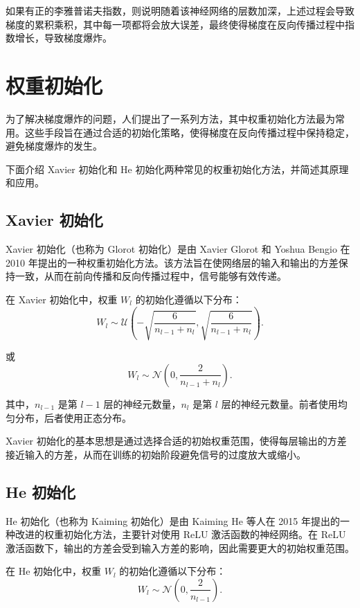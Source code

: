 如果有正的李雅普诺夫指数，则说明随着该神经网络的层数加深，上述过程会导致梯度的累积乘积，其中每一项都将会放大误差，最终使得梯度在反向传播过程中指数增长，导致梯度爆炸。

\section{权重初始化}

为了解决梯度爆炸的问题，人们提出了一系列方法，其中权重初始化方法最为常用。这些手段旨在通过合适的初始化策略，使得梯度在反向传播过程中保持稳定，避免梯度爆炸的发生。

下面介绍 Xavier 初始化和 He 初始化两种常见的权重初始化方法，并简述其原理和应用。

\subsection{Xavier 初始化}

Xavier 初始化（也称为 Glorot 初始化）是由 Xavier Glorot 和 Yoshua Bengio 在 2010 年提出的一种权重初始化方法。该方法旨在使网络层的输入和输出的方差保持一致，从而在前向传播和反向传播过程中，信号能够有效传递。

在 Xavier 初始化中，权重 \( W_l \) 的初始化遵循以下分布：
\begin{equation}
  W_l \sim \mathcal{U}\left(-\sqrt{\frac{6}{n_{l-1} + n_l}}, \sqrt{\frac{6}{n_{l-1} + n_l}}\right).
\end{equation}

或
\begin{equation}
  W_l \sim \mathcal{N}\left(0, \frac{2}{n_{l-1} + n_l}\right).
\end{equation}

其中，\( n_{l-1} \) 是第 \( l-1 \) 层的神经元数量，\( n_l \) 是第 \( l \) 层的神经元数量。前者使用均匀分布，后者使用正态分布。

Xavier 初始化的基本思想是通过选择合适的初始权重范围，使得每层输出的方差接近输入的方差，从而在训练的初始阶段避免信号的过度放大或缩小。

\subsection{He 初始化}

He 初始化（也称为 Kaiming 初始化）是由 Kaiming He 等人在 2015 年提出的一种改进的权重初始化方法，主要针对使用 ReLU 激活函数的神经网络。在 ReLU 激活函数下，输出的方差会受到输入方差的影响，因此需要更大的初始权重范围。

在 He 初始化中，权重 \( W_l \) 的初始化遵循以下分布：
\begin{equation}
  W_l \sim \mathcal{N}\left(0, \frac{2}{n_{l-1}}\right).
\end{equation}

